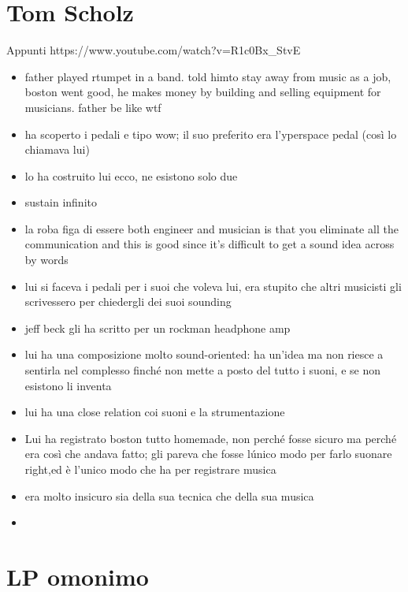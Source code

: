 \documentclass[class=book, crop=false, oneside, 12pt]{standalone}
\begin{document}
\section{Tom Scholz}
Appunti https://www.youtube.com/watch?v=R1c0Bx_StvE

\begin{itemize}
    \item  father played rtumpet in a band. told himto stay away from music as a job, boston went good, he makes money by building and selling equipment for musicians. father be like wtf
    \item ha scoperto i pedali e tipo wow; il suo preferito era l'yperspace pedal (così lo chiamava lui)
    \item lo ha costruito lui ecco, ne esistono solo due
    \item sustain infinito
    \item la roba figa di essere both engineer and musician is that you eliminate all the communication and this is good since it's difficult to get a sound idea across by words
    \item lui si faceva i pedali per i suoi che voleva lui, era stupito che altri musicisti gli scrivessero per chiedergli dei suoi sounding
    \item jeff beck gli ha scritto per un rockman headphone amp
    \item lui ha una composizione molto sound-oriented: ha un'idea ma non riesce a sentirla nel complesso finché non mette a posto del tutto i suoni, e se non esistono li inventa
    \item lui ha una close relation coi suoni e la strumentazione
    \item Lui ha registrato boston tutto homemade, non perché fosse sicuro ma perché era così che andava fatto; gli pareva che fosse lúnico modo per farlo suonare right,ed è l'unico modo che ha per registrare musica
    \item era molto insicuro sia della sua tecnica che della sua musica
    \item 
\end{itemize}

\section{LP omonimo}
\end{document}
